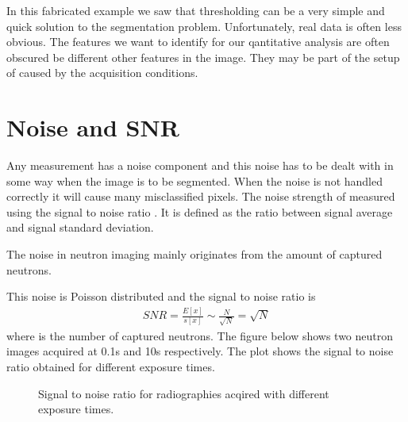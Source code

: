\documentclass[letterpaper,10pt,english]{sphinxmanual}
\begin{document}
\begin{sphinxVerbatim}[commandchars=\\\{\}]
\PYG{p}{[}\PYG{p}{]} \PYG{p}{[}\PYG{p}{]} \PYG{p}{[}\PYG{p}{]}
\end{sphinxVerbatim}

\noindent{}

In this fabricated example we saw that thresholding can be a very simple and quick solution to the segmentation problem. Unfortunately, real data is often less obvious. The features we want to identify for our qantitative analysis are often obscured be different other features in the image. They may be part of the setup of caused by the acquisition conditions.


\section{Noise and SNR}
\label{\detokenize{ML4NeutronImageSegmentation:noise-and-snr}}
Any measurement has a noise component and this noise has to be dealt with in some way when the image is to be segmented. When the noise is not handled correctly it will cause many misclassified pixels. The noise strength of measured using the signal to noise ratio . It is defined as the ratio between signal average and signal standard deviation.

The noise in neutron imaging mainly originates from the amount of captured neutrons.



This noise is Poisson distributed and the signal to noise ratio is
\begin{equation*}
\begin{split}SNR=\frac{E[x]}{s[x]}\sim\frac{N}{\sqrt{N}}=\sqrt{N}\end{split}
\end{equation*}
where  is the number of captured neutrons. The figure below shows two neutron images acquired at 0.1s and 10s respectively. The plot shows the signal to noise ratio obtained for different exposure times.

\begin{figure}[htbp]
\centering
\capstart

\noindent{}
\caption{Signal to noise ratio for radiographies acqired with different exposure times.}\label{\detokenize{ML4NeutronImageSegmentation:id10}}\end{figure}
\end{document}
